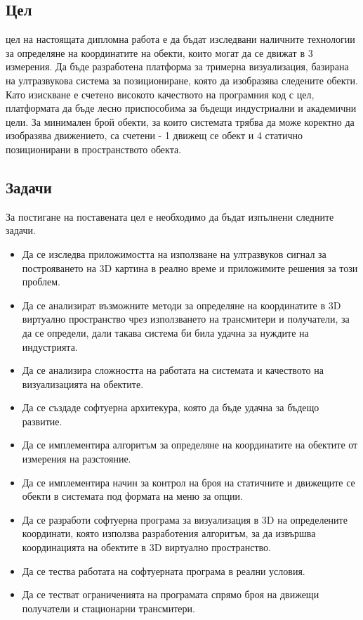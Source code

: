 \subsection{Цел}
 цел на настоящата дипломна работа е да бъдат изследвани наличните технологии за определяне на координатите на обекти, които могат да се движат в 3 измерения. Да бъде разработена платформа за тримерна визуализация, базирана на ултразвукова система за позициониране, която да изобразява следените обекти. Като изискване е счетено високото качеството на програмния код с цел, платформата да бъде лесно приспособима за бъдещи индустриални и академични цели. За минимален брой обекти, за които системата трябва да може коректно да изобразява движението, са счетени - 1 движещ се обект и 4 статично позиционирани в пространството обекта. 

\subsection{Задачи}
За постигане на поставената цел е необходимо да бъдат изпълнени следните задачи.

\begin{itemize}
    \item Да се изследва приложимостта на използване на ултразвуков сигнал за построяването на 3D картина в реално време и приложимите решения за този проблем.
      
    \item Да се анализират възможните методи за определяне на координатите в 3D виртуално пространство чрез използването на трансмитери и получатели, за да се определи, дали такава система би била удачна за нуждите на индустрията.
    
    \item Да се анализира сложността на работата на системата и качеството на визуализацията на обектите.
    
    \item Да се създаде софтуерна архитекура, която да бъде удачна за бъдещо развитие. 
    
    \item Да се имплементира алгоритъм за определяне на координатите на обектите от измерения на разстояние.
    
    \item Да се имплементира начин за контрол на броя на статичните и движещите се обекти в системата под формата на меню за опции.
    
    \item Да се разработи софтуерна програма за визуализация в 3D на определените координати, която използва разработения алгоритъм, за да извършва координацията на обектите в 3D виртуално пространство.
    
    \item Да се тества работата на софтуерната програма в реални условия.
    
    \item Да се тестват ограниченията на програмата спрямо броя на движещи получатели и стационарни трансмитери.
\end{itemize}